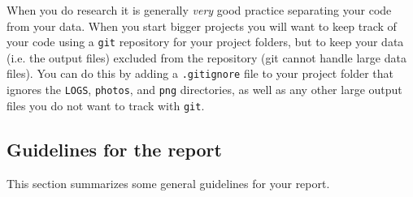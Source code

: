 
%



\begin{tcolorbox}[protipbox]
When you do research it is generally \textit{very} good practice separating your code from your data. 
When you start bigger projects you will want to keep track of your code using a \texttt{git} repository for your project folders, but to keep your data (i.e. the output files) excluded from the repository (git cannot handle large data files).
You can do this by adding a \texttt{.gitignore} file to your project folder that ignores the \texttt{LOGS}, \texttt{photos}, and \texttt{png} directories, as well as any other large output files you do not want to track with \texttt{git}.
\end{tcolorbox}



\subsection*{Guidelines for the report}

This section summarizes some general guidelines for your report.

